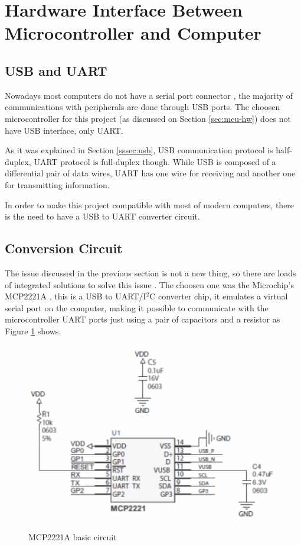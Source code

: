 \section{Hardware Interface Between Microcontroller and Computer}\label{sec:hardware-interface-between-mcu-and-computer}

	\subsection{USB and UART}\label{ssec:usb-and-uart}
		Nowadays most computers do not have a serial port connector \cite{serialPortNeverSayDie}, the majority of communications with peripherals are done through USB ports. The choosen microcontroller for this project (as discussed on Section \ref{sec:mcu-hw}) does not have USB interface, only UART. 

		As it was explained in Section \ref{sssec:usb}, USB communication protocol is half-duplex, UART protocol is full-duplex though. While USB is composed of a differential pair of data wires, UART has one wire for receiving and another one for transmitting information. 

		In order to make this project compatible with most of modern computers, there is the need to have a USB to UART converter circuit.

	\subsection{Conversion Circuit}\label{ssec:usb-uart-conversion-circuit}

		The issue discussed in the previous section is not a new thing, so there are loads of integrated solutions to solve this issue \cite{usbSerialAdapter}. The choosen one was the Microchip's MCP2221A \cite{mcp2221a-datasheet}, this is a USB to UART/I$^2$C converter chip, it emulates a virtual serial port on the computer, making it possible to communicate with the microcontroller UART ports just using a pair of capacitors and a resistor as Figure \ref{fig:mcp2221a-basic-circuit} shows.

		\begin{figure}[htbp]
			\centering
				\includegraphics[width=.8\textwidth]{figuras/fig-mcp2221a-basic-circuit}
			\caption{MCP2221A basic circuit \cite{mcp2221a-basic-circuit}}
			\label{fig:mcp2221a-basic-circuit}
		\end{figure}

